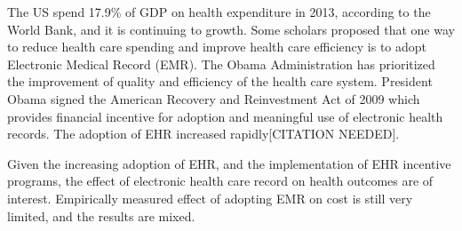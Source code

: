 The US spend 17.9\% of GDP on health expenditure in 2013, according to the World Bank, and it is continuing to growth. Some scholars proposed that one way to reduce health care spending and improve health care efficiency is to adopt Electronic Medical Record (EMR). The Obama Administration has prioritized the improvement of quality and efficiency of the health care system. President Obama signed the American Recovery and Reinvestment Act of 2009 which provides financial incentive for adoption and meaningful use of electronic health records. The adoption of EHR increased rapidly[CITATION NEEDED].

Given the increasing adoption of EHR, and the implementation of EHR incentive programs, the effect of electronic health care record on health outcomes are of interest. Empirically measured effect of adopting EMR on cost is still very limited, and the results are mixed.
